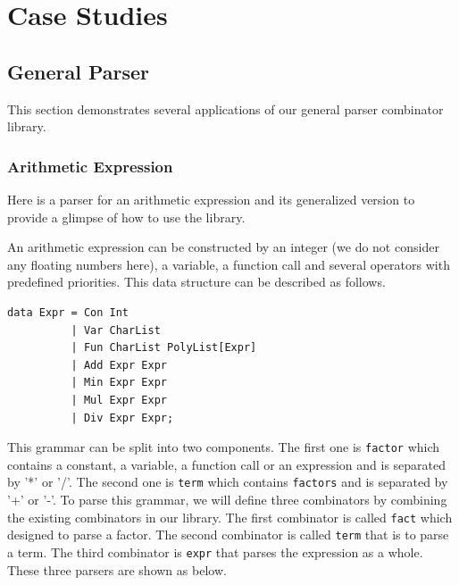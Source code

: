 \chapter{Case Studies} \label{section:mparser}

\section{General Parser}
This section demonstrates several applications of our general parser combinator library.

\subsection{Arithmetic Expression}
Here is a parser for an arithmetic expression and its generalized version to provide a glimpse of how to use the library.

An arithmetic expression can be constructed by an integer (we do not consider any floating numbers here), a variable, a function call and several operators with predefined priorities. This data structure can be described as follows.

\begin{lstlisting}
data Expr = Con Int
          | Var CharList
          | Fun CharList PolyList[Expr]
          | Add Expr Expr
          | Min Expr Expr
          | Mul Expr Expr
          | Div Expr Expr;
\end{lstlisting}

This grammar can be split into two components. The first one is \texttt{factor} which contains a constant, a variable, a function call or an expression and is separated by '*' or '/'.  The second one is \texttt{term} which contains \texttt{factors} and is separated by '+' or '-'.
To parse this grammar, we will define three combinators by combining the existing combinators in our library. The first combinator is called \texttt{fact} which designed to parse a factor. The second combinator is called \texttt{term} that is to parse a term. The third combinator is \texttt{expr} that parses the expression as a whole. These three parsers are shown as below.


